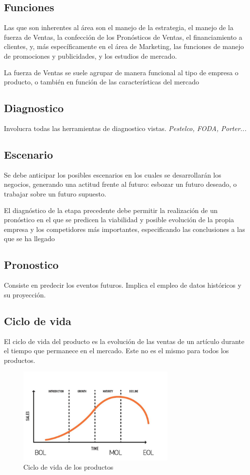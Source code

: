 \documentclass[titlepage,a4paper]{article}
\begin{document}
\subsection*{Funciones}
Las que son inherentes al área son el manejo de la estrategia, el manejo de la fuerza de Ventas, la
confección de los Pronósticos de Ventas, el financiamiento a clientes, y, más específicamente en el área de
Marketing, las funciones de manejo de promociones y publicidades, y los estudios de mercado.

La fuerza de Ventas se suele agrupar de manera funcional al tipo de empresa o producto, o también en
función de las características del mercado

\subsection*{Diagnostico}
Involucra todas las herramientas de diagnostico vistas. \textit{Pestelco, FODA, Porter...}

\subsection*{Escenario}
Se debe anticipar los posibles escenarios en los cuales se desarrollarán los negocios, generando una
actitud frente al futuro: esbozar un futuro deseado, o trabajar sobre un futuro supuesto.

El diagnóstico de la etapa precedente debe permitir la realización de un pronóstico en el que se predicen
la viabilidad y posible evolución de la propia empresa y los competidores más importantes, especificando las
conclusiones a las que se ha llegado

\subsection*{Pronostico}
Consiste en predecir los eventos futuros. Implica el empleo de datos históricos y su proyección.

\subsection*{Ciclo de vida}
El ciclo de vida del producto es la evolución de las ventas de un artículo durante el tiempo que permanece en el mercado. Este no es el mismo para todos los productos.

\begin{figure}[!htb]
    \centering
    \includegraphics[width=0.7\textwidth]{imagenes/cicloDeVidaProducto.jpg}
    \caption{Ciclo de vida de los productos}
\end{figure}
\end{document}
